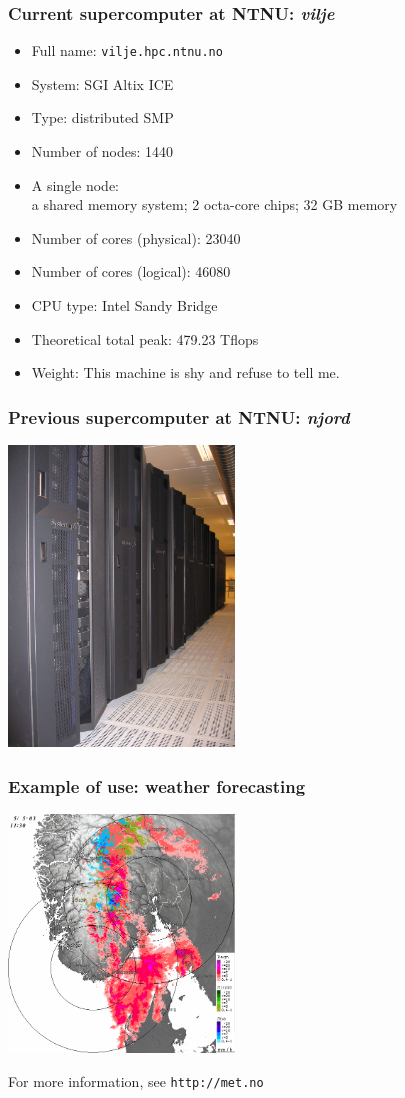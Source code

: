 \documentclass{beamer}
\begin{document}
\begin{frame}\frametitle{Current supercomputer at NTNU: {\em vilje}}
\begin{itemize}
\item Full name: \texttt{vilje.hpc.ntnu.no}
\item System: SGI Altix ICE
\item Type: distributed SMP 
\item Number of nodes: 1440
\item A single node: \\
a shared memory system; 2 octa-core chips; 32 GB memory
\item Number of cores (physical): 23040
\item Number of cores (logical): 46080
\item CPU type: Intel Sandy Bridge
\item Theoretical total peak: 479.23 Tflops
\item Weight: This machine is shy and refuse to tell me.
\end{itemize}
\end{frame}


\begin{frame}\frametitle{Previous supercomputer at NTNU: {\em njord}}
\begin{center}
\includegraphics[width=6cm]{njord_1}
\end{center}
\end{frame}

\begin{frame}\frametitle{Example of use: weather forecasting}
\begin{center}
\includegraphics[width=6cm]{met}
\end{center}
For more information, see \texttt{http://met.no}
\end{frame}
\end{document}
